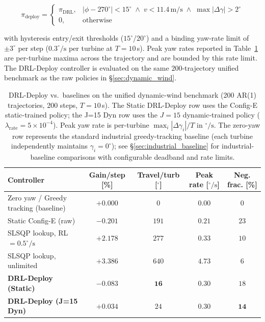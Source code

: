\documentclass[final,5p,times]{elsarticle}
\begin{document}
\[
\pi_{\mathrm{deploy}} =
\begin{cases}
\pi_{\mathrm{DRL}}, & |\phi{-}270^\circ|{<}15^\circ \;\wedge\; v{<}11.4\,\mathrm{m/s} \;\wedge\; \max|\Delta\gamma|{>}2^\circ \\
0, & \text{otherwise}
\end{cases}
\]

with hysteresis entry/exit thresholds ($15^\circ$/$20^\circ$) and a binding yaw-rate limit of ${\pm}3^\circ$ per step ($0.3^\circ\!/\!\mathrm{s}$ per turbine at $T{=}10$\,s). Peak yaw rates reported in Table~\ref{tab:deploy} are per-turbine maxima across the trajectory and are bounded by this rate limit. The DRL-Deploy controller is evaluated on the same $200$-trajectory unified benchmark as the raw policies in \S\ref{sec:dynamic_wind}.

\begin{table}[h]
\centering
\caption{DRL-Deploy vs.\ baselines on the unified dynamic-wind benchmark (200 AR(1) trajectories, 200 steps, $T{=}10$\,s). The Static DRL-Deploy row uses the Config-E static-trained policy; the J=15 Dyn row uses the $J{=}15$ dynamic-trained policy ($\lambda_\mathrm{rate}{=}5{\times}10^{-4}$). Peak yaw rate is per-turbine $\max_i|\Delta\gamma_i|/T$ in $^\circ\!/\!\mathrm{s}$. The zero-yaw row represents the standard industrial greedy-tracking baseline (each turbine independently maintains $\gamma_i{=}0^\circ$); see \S\ref{sec:industrial_baseline} for industrial-baseline comparisons with configurable deadband and rate limits.}
\label{tab:deploy}
\small
\begin{tabular}{lcccc}
\toprule
Controller & Gain/step [\%] & Travel/turb [$^\circ$] & Peak rate [$^\circ\!/\!\mathrm{s}$] & Neg. frac. [\%] \\
\midrule
Zero yaw / Greedy tracking (baseline) & $+0.000$ & $0$   & $0.00$ & $0$ \\
Static Config-E (raw)     & $-0.201$ & $191$ & $0.21$ & $23$ \\
SLSQP lookup, RL$=0.5^\circ\!/\!\mathrm{s}$ & $+2.178$ & $277$ & $0.33$ & $10$ \\
SLSQP lookup, unlimited   & $+3.386$ & $640$ & $4.73$ & $6$ \\
\textbf{DRL-Deploy (Static)} & $-0.083$ & $\mathbf{16}$ & $0.30$ & $18$ \\
\textbf{DRL-Deploy (J=15 Dyn)} & $\mathbf{+0.034}$ & $24$ & $0.30$ & $\mathbf{14}$ \\
\bottomrule
\end{tabular}
\end{table}
\end{document}
